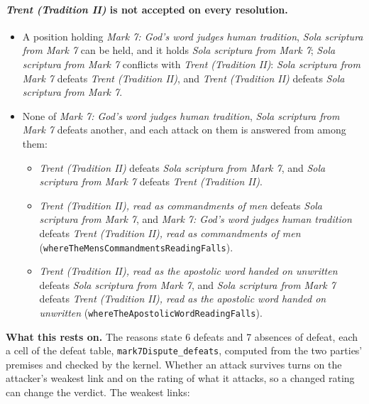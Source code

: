 \documentclass[11pt]{article}
\begin{document}
\paragraph{\emph{Trent (Tradition II)} is not accepted on every resolution.}
\begin{itemize}
\item A position holding \emph{Mark 7: God's word judges human tradition}, \emph{Sola scriptura from Mark 7} can be held, and it holds \emph{Sola scriptura from Mark 7}; \emph{Sola scriptura from Mark 7} conflicts with \emph{Trent (Tradition II)}: \emph{Sola scriptura from Mark 7} defeats \emph{Trent (Tradition II)}, and \emph{Trent (Tradition II)} defeats \emph{Sola scriptura from Mark 7}.
\item None of \emph{Mark 7: God's word judges human tradition}, \emph{Sola scriptura from Mark 7} defeats another, and each attack on them is answered from among them:
\begin{itemize}
\item \emph{Trent (Tradition II)} defeats \emph{Sola scriptura from Mark 7}, and \emph{Sola scriptura from Mark 7} defeats \emph{Trent (Tradition II)}.
\item \emph{Trent (Tradition II), read as commandments of men} defeats \emph{Sola scriptura from Mark 7}, and \emph{Mark 7: God's word judges human tradition} defeats \emph{Trent (Tradition II), read as commandments of men} (\texttt{where\allowbreak{}The\allowbreak{}Mens\allowbreak{}Commandments\allowbreak{}Reading\allowbreak{}Falls}).
\item \emph{Trent (Tradition II), read as the apostolic word handed on unwritten} defeats \emph{Sola scriptura from Mark 7}, and \emph{Sola scriptura from Mark 7} defeats \emph{Trent (Tradition II), read as the apostolic word handed on unwritten} (\texttt{where\allowbreak{}The\allowbreak{}Apostolic\allowbreak{}Word\allowbreak{}Reading\allowbreak{}Falls}).
\end{itemize}
\end{itemize}
\par\noindent\textbf{What this rests on.} The reasons state 6 defeats and 7 absences of defeat, each a cell of the defeat table, \texttt{mark7\allowbreak{}Dispute\_\allowbreak{}defeats}, computed from the two parties' premises and checked by the kernel. Whether an attack survives turns on the attacker's weakest link and on the rating of what it attacks, so a changed rating can change the verdict. The weakest links:
\end{document}
